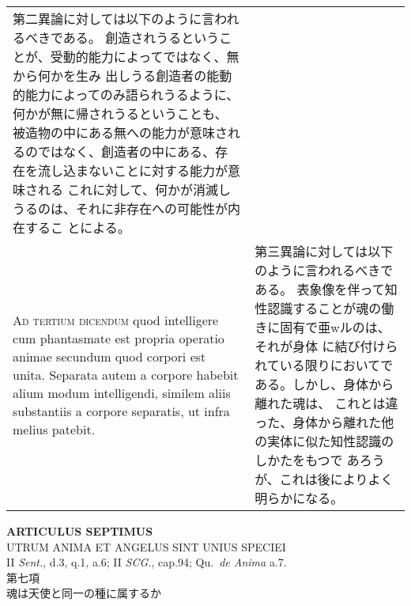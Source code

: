 \documentclass[10pt]{jsarticle} %
\begin{document}
\begin{longtable}{p{21em}p{21em}}
第二異論に対しては以下のように言われるべきである。
創造されうるということが、受動的能力によってではなく、無から何かを生み
 出しうる創造者の能動的能力によってのみ語られうるように、何かが無に帰されうるということも、
被造物の中にある無への能力が意味されるのではなく、創造者の中にある、存
 在を流し込まないことに対する能力が意味される
これに対して、何かが消滅しうるのは、それに非存在への可能性が内在するこ
 とによる。

\\



{\scshape Ad tertium dicendum} quod intelligere cum phantasmate est propria
operatio animae secundum quod corpori est unita. Separata autem a
corpore habebit alium modum intelligendi, similem aliis substantiis a
corpore separatis, ut infra melius patebit.


&

第三異論に対しては以下のように言われるべきである。
表象像を伴って知性認識することが魂の働きに固有で亜wルのは、それが身体
 に結び付けられている限りにおいてである。しかし、身体から離れた魂は、
 これとは違った、身体から離れた他の実体に似た知性認識のしかたをもつで
 あろうが、これは後によりよく明らかになる。


\\

\end{longtable}
\newpage

\begin{center}
{\Large {\bf ARTICULUS SEPTIMUS}}\\
{\large UTRUM ANIMA ET ANGELUS SINT UNIUS SPECIEI}\\
{\footnotesize II {\itshape Sent.}, d.3, q.1, a.6; II {\itshape SCG.},
 cap.94; Qu.~{\itshape de Anima} a.7.}\\
{\Large 第七項\\魂は天使と同一の種に属するか}
\end{center}
\end{document}
